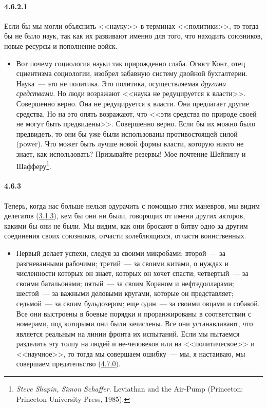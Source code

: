 \paragraph{4.6.2.1}\hypertarget{par:4.6.2.1}{} Если бы мы могли объяснить <<науку>> в терминах <<политики>>, то тогда бы не было наук, так как их развивают именно для того, что находить союзников, новые ресурсы и пополнение войск. 
	\begin{itemize}
	\item 
	Вот почему социология науки так прирожденно слаба. Огюст Конт, отец сциентизма социологии, изобрел забавную систему двойной бухгалтерии. Наука~--- это не политика. Это политика, осуществляемая {\itshape другими средствами}. Но люди возражают <<наука не редуцируется к власти>>. Совершенно верно. Она не редуцируется к власти. Она предлагает другие средства. Но на это опять возражают, что <<эти средства по природе своей не могут быть предвидены>>. Совершенно верно. Если бы их можно было предвидеть, то они бы уже были использованы противостоящей силой (power). Что может быть лучше новой формы власти, которую никто не знает, как использовать? Призывайте резервы! Мое почтение Шейпину и Шафферу\footnote{{\itshape Steve Shapin, Simon Schaffer}. Leviathan and the Air-Pump (Prince­ton: Princeton University Press, 1985).}.
	\end{itemize}	

\paragraph{4.6.3}\hypertarget{par:4.6.3}{} Теперь, когда нас больше нельзя одурачить с помощью этих маневров, мы видим делегатов (\hyperlink{par:3.1.3}{3.1.3}), кем бы они ни были, говорящих от имени других акторов, какими бы они не были. Мы видим, как они бросают в битву одно за другим соединения своих союзников, отчасти колеблющихся, отчасти воинственных. 

	\begin{itemize}
	\item 
	Первый делает успехи, следуя за своими микробами; второй~--- за разгневанными рабочими; третий~--- за своими китами, о нуждах и численности которых он знает, которых он хочет спасти; четвертый~--- за своими батальонами; пятый~--- за своим Кораном и нефтедолларами; шестой~--- за важными деловыми кругами, которые он представляет; седьмой~--- за своим бульдозером; еще один~--- за своими овцами и собакой. Все они выстроены в боевые порядки и проранжированы в соответствии с номерами, под которыми они были зачислены. Все они устанавливают, что является реальным на линии фронта их испытаний. Если мы пытаемся разделить эту толпу на людей и не-человеков или на <<политическое>> и <<научное>>, то тогда мы совершаем ошибку~--- мы, я настаиваю, мы совершаем предательство (\hyperlink{par:4.7.0}{4.7.0}).
	\end{itemize}	

